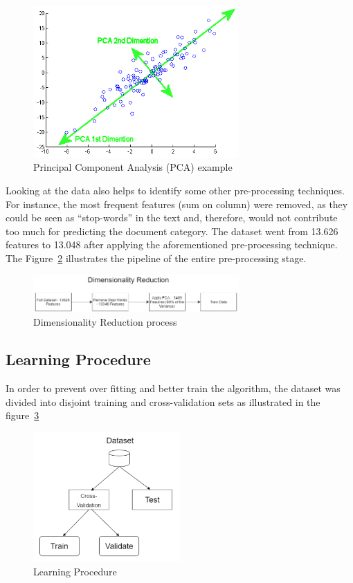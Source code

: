 \documentclass[letterpaper,10pt]{article}
\theoremstyle{mytheor}
\begin{document}
\begin{figure}[H]
\includegraphics[width=0.7\textwidth]{pca}
\centering
\caption{Principal Component Analysis (PCA) example}
\label{fig:3}
\end{figure}

Looking at the data also helps to identify some other pre-processing techniques. For instance, the most frequent features (sum on column) were removed, as they could be seen as “stop-words” in the text and, therefore, would not contribute too much for predicting the document category. The dataset went from 13.626 features to 13.048 after applying the aforementioned pre-processing technique. The Figure~\ref{fig:4} illustrates the pipeline of the entire pre-processing stage.

\begin{figure}[H]
\includegraphics[width=0.7\textwidth]{pre-processing}
\centering
\caption{Dimensionality Reduction process}
\label{fig:4}
\end{figure}

\subsection{Learning Procedure}

In order to prevent over fitting and better train the algorithm, the dataset was divided into disjoint training and cross-validation sets as illustrated in the figure~\ref{fig:5}

\begin{figure}[H]
\includegraphics[width=0.5\textwidth]{procedure}
\centering
\caption{Learning Procedure}
\label{fig:5}
\end{figure}
\end{document}
